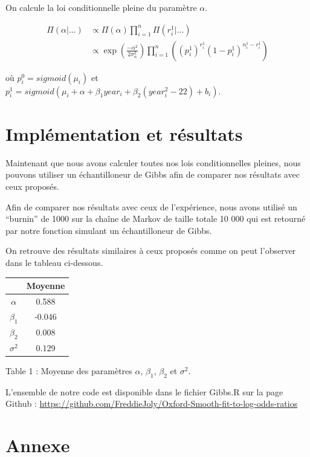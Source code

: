 \documentclass[
]{article}
\begin{document}
On calcule la loi conditionnelle pleine du paramètre \(\alpha\).

\begin{align*}
\Pi(\alpha|...) &\propto \Pi(\alpha) \prod_{i=1}^n\Pi(r_i^1|...) \\
&\propto \exp\left({\frac{-\alpha^2}{2\sigma_{\alpha}^2}}\right)\prod_{i=1}^n \left((p_i^1)^{r_i^1}(1-p_i^1)^{n_i^1-r_i^1}\right)
\end{align*}

où \(p_i^0=sigmoid(\mu_i)\) et
\(p_i^1=sigmoid(\mu_i+\alpha+\beta_1 year_i+\beta_2(year_i^2-22)+b_i)\).

\hypertarget{impluxe9mentation-et-ruxe9sultats}{%
\section{Implémentation et
résultats}\label{impluxe9mentation-et-ruxe9sultats}}

Maintenant que nous avons calculer toutes nos lois conditionnelles
pleines, nous pouvons utiliser un échantilloneur de Gibbs afin de
comparer nos résultats avec ceux proposés.

Afin de comparer nos résultats avec ceux de l'expérience, nous avons
utilisé un ``burnin'' de 1000 sur la chaîne de Markov de taille totale
10 000 qui est retourné par notre fonction simulant un échantilloneur de
Gibbs.

On retrouve des résultats similaires à ceux proposés comme on peut
l'observer dans le tableau ci-dessous.

\begin{longtable}[]{@{}cc@{}}
\toprule
& Moyenne \\
\midrule
\endhead
\(\alpha\) & 0.588 \\
\(\beta_1\) & -0.046 \\
\(\beta_2\) & 0.008 \\
\(\sigma^2\) & 0.129 \\
\bottomrule
\end{longtable}

\begin{center}
Table 1 : Moyenne des paramètres $\alpha$, $\beta_1$, $\beta_2$ et $\sigma^2$.
\end{center}

L'ensemble de notre code est disponible dans le fichier Gibbs.R sur la
page Github :
\url{https://github.com/FreddieJoly/Oxford-Smooth-fit-to-log-odds-ratios}

\newpage

\hypertarget{annexe}{%
\section{Annexe}\label{annexe}}
\end{document}
